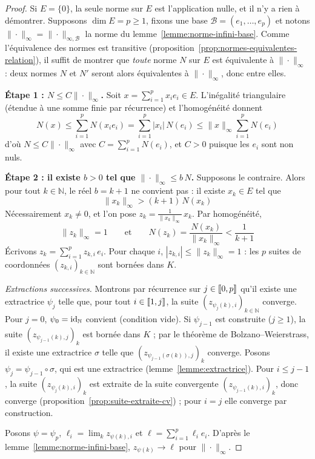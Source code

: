 \begin{proof}
Si $E=\{0\}$, la seule norme sur $E$ est l'application nulle, et il n'y a rien à démontrer. Supposons $\dim E=p\geq 1$, fixons une base $\mathcal{B}=(e_1,\dots,e_p)$ et notons $\|\cdot\|_\infty=\|\cdot\|_{\infty,\mathcal{B}}$ la norme du lemme~\ref{lemme:norme-infini-base}. Comme l'équivalence des normes est transitive (proposition~\ref{prop:normes-equivalentes-relation}), il suffit de montrer que \emph{toute} norme $N$ sur $E$ est équivalente à $\|\cdot\|_\infty$ : deux normes $N$ et $N'$ seront alors équivalentes à $\|\cdot\|_\infty$, donc entre elles.

\textbf{Étape 1 : $N\leq C\|\cdot\|_\infty$.} Soit $x=\sum_{i=1}^px_ie_i\in E$. L'inégalité triangulaire (étendue à une somme finie par récurrence) et l'homogénéité donnent
\[N(x)\leq\sum_{i=1}^{p}N(x_ie_i)=\sum_{i=1}^{p}|x_i|\,N(e_i)\leq\|x\|_\infty\sum_{i=1}^{p}N(e_i)\]
d'où $N\leq C\|\cdot\|_\infty$ avec $C=\sum_{i=1}^pN(e_i)$, et $C>0$ puisque les $e_i$ sont non nuls.

\textbf{Étape 2 : il existe $b>0$ tel que $\|\cdot\|_\infty\leq b\,N$.} Supposons le contraire. Alors pour tout $k\in\mathbb{N}$, le réel $b=k+1$ ne convient pas : il existe $x_k\in E$ tel que
\[\|x_k\|_\infty>(k+1)\,N(x_k)\]
Nécessairement $x_k\neq 0$, et l'on pose $z_k=\frac{1}{\|x_k\|_\infty}\,x_k$. Par homogénéité,
\[\|z_k\|_\infty=1\qquad\text{et}\qquad N(z_k)=\frac{N(x_k)}{\|x_k\|_\infty}<\frac{1}{k+1} \tag{$\star$}\]
Écrivons $z_k=\sum_{i=1}^p z_{k,i}\,e_i$. Pour chaque $i$, $|z_{k,i}|\leq\|z_k\|_\infty=1$ : les $p$ suites de coordonnées $(z_{k,i})_{k\in\mathbb{N}}$ sont bornées dans $K$.

\emph{Extractions successives.} Montrons par récurrence sur $j\in\llbracket 0,p \rrbracket$ qu'il existe une extractrice $\psi_j$ telle que, pour tout $i\in\llbracket 1,j \rrbracket$, la suite $(z_{\psi_j(k),i})_{k\in\mathbb{N}}$ converge. Pour $j=0$, $\psi_0=\operatorname{id}_{\mathbb{N}}$ convient (condition vide). Si $\psi_{j-1}$ est construite ($j\geq 1$), la suite $(z_{\psi_{j-1}(k),j})_{k}$ est bornée dans $K$ ; par le théorème de Bolzano--Weierstrass, il existe une extractrice $\sigma$ telle que $(z_{\psi_{j-1}(\sigma(k)),j})_{k}$ converge. Posons $\psi_j=\psi_{j-1}\circ\sigma$, qui est une extractrice (lemme~\ref{lemme:extractrice}). Pour $i\leq j-1$, la suite $(z_{\psi_j(k),i})_k$ est extraite de la suite convergente $(z_{\psi_{j-1}(k),i})_k$, donc converge (proposition~\ref{prop:suite-extraite-cv}) ; pour $i=j$ elle converge par construction.

Posons $\psi=\psi_p$, $\ell_i=\lim_{k}z_{\psi(k),i}$ et $\ell=\sum_{i=1}^p\ell_ie_i$. D'après le lemme~\ref{lemme:norme-infini-base}, $z_{\psi(k)}\to\ell$ pour $\|\cdot\|_\infty$.


\end{proof}
